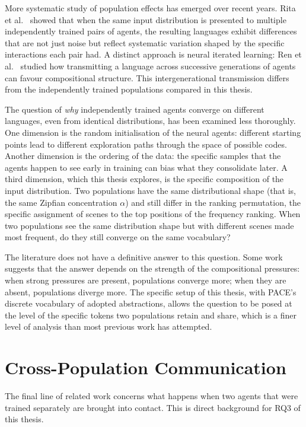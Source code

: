 More systematic study of population effects has emerged over recent years. Rita et al.~\cite{rita_role_2022} showed that when the same input distribution is presented to multiple independently trained pairs of agents, the resulting languages exhibit differences that are not just noise but reflect systematic variation shaped by the specific interactions each pair had. A distinct approach is neural iterated learning: Ren et al.~\cite{ren_compositional_2020} studied how transmitting a language across successive generations of agents can favour compositional structure. This intergenerational transmission differs from the independently trained populations compared in this thesis.

The question of \textit{why} independently trained agents converge on different languages, even from identical distributions, has been examined less thoroughly. One dimension is the random initialisation of the neural agents: different starting points lead to different exploration paths through the space of possible codes. Another dimension is the ordering of the data: the specific samples that the agents happen to see early in training can bias what they consolidate later. A third dimension, which this thesis explores, is the specific composition of the input distribution. Two populations have the same distributional shape (that is, the same Zipfian concentration $\alpha$) and still differ in the ranking permutation, the specific assignment of scenes to the top positions of the frequency ranking. When two populations see the same distribution shape but with different scenes made most frequent, do they still converge on the same vocabulary?

The literature does not have a definitive answer to this question. Some work suggests that the answer depends on the strength of the compositional pressures: when strong pressures are present, populations converge more; when they are absent, populations diverge more. The specific setup of this thesis, with PACE's discrete vocabulary of adopted abstractions, allows the question to be posed at the level of the specific tokens two populations retain and share, which is a finer level of analysis than most previous work has attempted.

\section{Cross-Population Communication}
\label{sec:bg-cross-population}

The final line of related work concerns what happens when two agents that were trained separately are brought into contact. This is direct background for RQ3 of this thesis.

